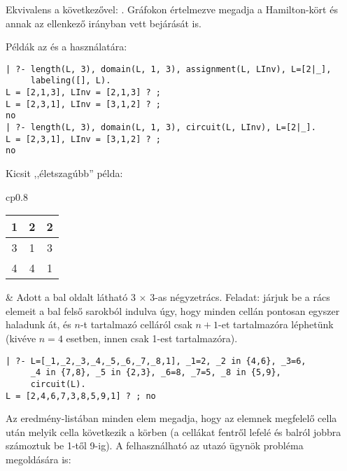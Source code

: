 \medskip

{}

Ekvivalens a következővel: . Gráfokon értelmezve
megadja a Hamilton-kört és annak az ellenkező irányban vett bejárását is.

Példák az  és a  használatára:

\begin{verbatim}
| ?- length(L, 3), domain(L, 1, 3), assignment(L, LInv), L=[2|_],
     labeling([], L).
L = [2,1,3], LInv = [2,1,3] ? ;
L = [2,3,1], LInv = [3,1,2] ? ;
no
| ?- length(L, 3), domain(L, 1, 3), circuit(L, LInv), L=[2|_].
L = [2,3,1], LInv = [3,1,2] ? ;
no
\end{verbatim}

Kicsit ,,életszagúbb'' példa:

\medskip

\begin{tabular}{cp{}}
\begin{tabular}{|c|c|c|}
\hline 1 & 2 & 2 \\ \hline 3 & 1 & 3 \\ \hline 4 & 4 & 1 \\ \hline
\end{tabular} &
\vspace{-1.5\baselineskip}
Adott a bal oldalt látható 3 $\times$ 3-as négyzetrács. Feladat: járjuk be
a rács elemeit a bal felső sarokból indulva úgy, hogy minden cellán pontosan
egyszer haladunk át, és $n$-t tartalmazó celláról csak $n+1$-et tartalmazóra
léphetünk (kivéve $n=4$ esetben, innen csak 1-est tartalmazóra). \\
\end{tabular}

\begin{verbatim}
| ?- L=[_1,_2,_3,_4,_5,_6,_7,_8,1], _1=2, _2 in {4,6}, _3=6,
     _4 in {7,8}, _5 in {2,3}, _6=8, _7=5, _8 in {5,9},
     circuit(L).
L = [2,4,6,7,3,8,5,9,1] ? ; no
\end{verbatim}

Az eredmény-listában minden elem megadja, hogy az elemnek megfelelő cella után
melyik cella következik a körben (a cellákat fentről lefelé és balról jobbra
számoztuk be 1-től 9-ig).
\br
A  felhasználható az utazó ügynök probléma megoldására is:

